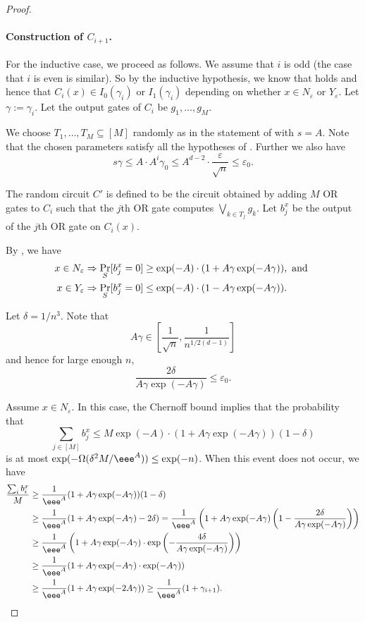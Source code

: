 \documentclass{toc}
\newcommand{\prob}[2]{\mathop{\mathrm{Pr}}_{#1}[#2]}
\begin{document}
\begin{proof}
\paragraph{Construction of $C_{i+1}$.} For the inductive case, we proceed as follows. We assume that $i$ is odd (the case that $i$ is even is similar). So by the inductive hypothesis, we know that  holds and hence that $C_{i}(x) \in I_0(\gamma_i)$ or $I_1(\gamma_i)$ depending on whether $x\in N_\varepsilon$ or $Y_\varepsilon$. Let $\gamma := \gamma_i$. Let the output gates of $C_i$ be $g_1,\ldots,g_M$.

We choose $T_1,\ldots,T_M\subseteq [M]$ randomly as in the statement of  with $s = A$. Note that the chosen parameters satisfy all the hypotheses of . Further we also have
\[
  s\gamma \leq A\cdot A^i\gamma_0 \leq A^{d-2}\cdot \frac{\varepsilon}{\sqrt{n}}\leq \varepsilon_0.
\]

The random circuit $C'$ is defined to be the circuit obtained by adding $M$ OR gates to $C_i$ such that the $j$th OR gate computes $\bigvee_{k\in T_j}g_k$. Let $b_j^x$ be the output of the $j$th OR gate on $C_i(x)$. 

By , we have
\begin{align}
x\in N_\varepsilon &\Rightarrow \prob{S}{b_j^x = 0} \geq \exp(-A)\cdot (1+A\gamma\exp(-A\gamma)), \text{ and }\notag \\
x\in Y_\varepsilon &\Rightarrow \prob{S}{b_j^x = 0} \leq \exp(-A)\cdot(1-A\gamma\exp(-A\gamma)).\label{eq:Ci.1}
\end{align}

Let $\delta = {1}/{n^3}$. Note that
\[
  A\gamma \in \left[\frac{1}{\sqrt{n}},\frac{1}{n^{1/2(d-1)}}\right]
\]
and hence for large enough $n$,
\[
  \frac{2\delta}{A\gamma\exp(-A\gamma)}\leq \varepsilon_0.
\]

Assume $x\in N_\varepsilon$. In this case, the Chernoff bound implies that the probability that
\[
  \sum_{j\in [M]}b_j^x\leq M\exp(-A)\cdot (1+A\gamma\exp(-A\gamma))(1-\delta)
\]
is at most $\exp(-\Omega(\delta^2M/\eee^A))\leq \exp(-n)$. When this
event does not occur, we have
\begin{align}
\frac{\sum_i b_i^x}{M}&\geq \frac{1}{\eee^A}(1+A\gamma\exp(-A\gamma))(1-\delta)\notag\\
&\geq \frac{1}{\eee^A}(1+A\gamma\exp(-A\gamma) -2\delta) = \frac{1}{\eee^A}\left(1+A\gamma\exp(-A\gamma)\left(1-\frac{2\delta}{A\gamma\exp(-A\gamma)}\right)\right)\notag\\
&\geq \frac{1}{\eee^A}\left(1+A\gamma\exp(-A\gamma)\cdot \exp\left(-\frac{4\delta}{A\gamma\exp(-A\gamma)}\right)\right)\notag\\
&\geq \frac{1}{\eee^A}(1+A\gamma\exp(-A\gamma)\cdot \exp(-A\gamma))\notag\\
&\geq \frac{1}{\eee^A}(1+A\gamma\exp(-2A\gamma))\geq \frac{1}{\eee^A}(1+\gamma_{i+1}).\label{eq:Ci.2}
\end{align}


\end{proof}
\end{document}

